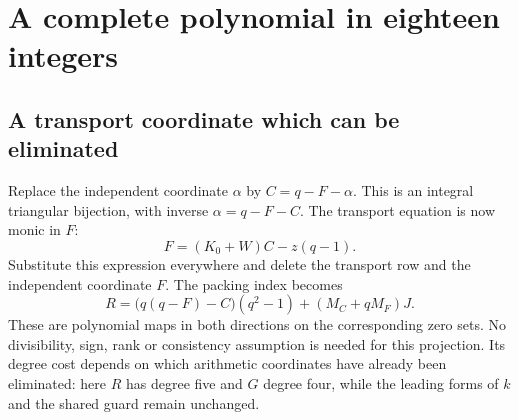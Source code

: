 \documentclass[11pt]{article}
\theoremstyle{remark}\newtheorem{remark}[theorem]{Remark}
\begin{document}
\section{A complete polynomial in eighteen integers}
\label{sec:explicit}

\subsection{A transport coordinate which can be eliminated}
Replace the independent coordinate $\alpha$ by $C=q-F-\alpha$.
This is an integral triangular bijection, with inverse
$\alpha=q-F-C$. The transport equation is now monic in $F$:
\begin{equation}
 F=(K_0+W)C-z(q-1).                         \label{eq:transportprojection}
\end{equation}
Substitute this expression everywhere and delete the transport row and
the independent coordinate $F$. The packing index becomes
\begin{equation}
 R=\bigl(q(q-F)-C\bigr)(q^2-1)+(M_C+qM_F)J. \label{eq:newR}
\end{equation}
These are polynomial maps in both directions on the corresponding zero
sets. No divisibility, sign, rank or consistency assumption is needed
for this projection. Its degree cost depends on which arithmetic
coordinates have already been eliminated: here $R$ has degree five and
$G$ degree four, while the leading forms of $k$ and the shared guard
remain unchanged.
\end{document}

